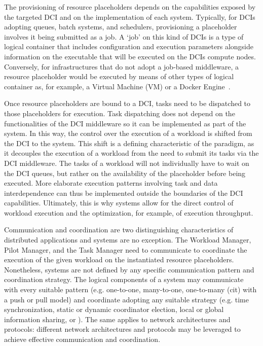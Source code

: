 \documentclass{sig-alternate}
\begin{document}

The provisioning of resource placeholders depends on the capabilities exposed
by the targeted DCI and on the implementation of each \pilot system. Typically,
for DCIs adopting queues, batch systems, and schedulers, provisioning a
placeholder involves it being submitted as a job. A `job' on this kind of DCIs
is a type of logical container that includes configuration and execution
parameters alongside information on the executable that will be executed on the
DCIs compute nodes. Conversely, for infrastructures that do not adopt a
job-based middleware, a resource placeholder would be executed by means of
other types of logical container as, for example, a Virtual Machine (VM) or a
Docker Engine~\cite{bernstein2014,felter2014}.

Once resource placeholders are bound to a DCI, tasks need to be dispatched to
those placeholders for execution. Task dispatching does not depend on the
functionalities of the DCI middleware so it can be implemented as part of the
\pilot system. In this way, the control over the execution of a workload is
shifted from the DCI to the \pilot system. This shift is a defining
characteristic of the \pilot paradigm, as it decouples the
execution of a workload from the need to submit its tasks via the DCI
middleware. The tasks of a workload will not individually have to wait on the
DCI queues, but rather on the availability of the placeholder before being
executed. More elaborate execution patterns involving task and data
interdependence can thus be implemented outside the boundaries of the DCI
capabilities. Ultimately, this is why \pilot systems allow for the direct
control of workload execution and the optimization, for example, of execution
throughput.

Communication and coordination are two distinguishing characteristics of
distributed applications and \pilot systems are no exception. The Workload
Manager, Pilot Manager, and the Task Manager need to communicate to coordinate
the execution of the given workload on the instantiated resource placeholders.
Nonetheless, \pilot systems are not defined by any specific communication
pattern and coordination strategy. The logical components of a \pilot system
may communicate with every suitable pattern (e.g. one-to-one, many-to-one,
one-to-many (cit) with a push or pull model) and coordinate adopting any
suitable strategy (e.g. time synchronization, static or dynamic coordinator
election, local or global information sharing, or \MW). The same applies to
network architectures and protocols: different network architectures and
protocols may be leveraged to achieve effective communication and coordination.
\end{document}
